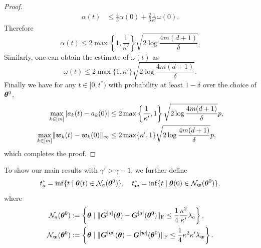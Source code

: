 \documentclass{article}
\begin{document}
\begin{proof}
\begin{align*}
        \alpha(t) & \leq\frac{4}{3}\alpha(0)+\frac{2}{3}\frac{1}{\kappa'}\omega(0).
    \end{align*}
    Therefore
    \begin{equation*}
        \alpha(t)\leq 2\max\left\{1,\frac{1}{\kappa'}\right\}\sqrt{2\log\frac{4m(d+1)}{\delta}}.
    \end{equation*}
    Similarly, one can obtain the estimate of $\omega(t)$ as
    \begin{equation*}
        \omega(t)\leq 2\max\{1,\kappa'\}\sqrt{2\log\frac{4m(d+1)}{\delta}}.
    \end{equation*}
    Finally we have for any $t\in[0, t^*)$ with probability at least $1-\delta$ over the choice of $\bm{\theta}^0$,
    \begin{equation*}
        \begin{aligned}
            \max\limits_{k\in[m]}|a_k(t) - a_k(0)|
             & \leq 2\max\left\{\frac{1}{\kappa'},1\right\}\sqrt{2\log\frac{4m(d+1)}{\delta}}p, \\
            \max\limits_{k\in[m]}\lVert\bm{w}_k(t) - \bm{w}_k(0)\rVert_{\infty}
             & \leq 2\max\{
            \kappa',1\}\sqrt{2\log\frac{4m(d+1)}{\delta}}p,
        \end{aligned}
    \end{equation*}
    which completes the proof.
\end{proof}

To show our main results with $\gamma'>\gamma-1$, we further define
\begin{equation}
    t^*_a=\inf\{t\mid \bm{\theta}(t)\in\mathcal{N}_a(\bm{\theta}^0)\}, \quad t^*_{\bm{w}}=\inf\{t\mid \bm{\theta}(0)\in\mathcal{N}_{\bm{w}}(\bm{\theta}^0)\},
\end{equation}
where
\begin{align}
    \mathcal{N}_a(\bm{\theta}^0)     & :=\left\{\bm{\theta}\mid\lVert\bm{G}^{[a]}(\bm{\theta})-\bm{G}^{[a]}(\bm{\theta}^0)\rVert_\mathrm{F}\leq\frac{1}{4}\frac{\kappa^2}{\kappa'}\lambda_a\right\}, \\
    \mathcal{N}_{\bm{w}}(\bm{\theta}^0) & :=\left\{\bm{\theta}\mid\lVert\bm{G}^{[\bm{w}]}(\bm{\theta})-\bm{G}^{[\bm{w}]}(\bm{\theta}^0)\rVert_\mathrm{F}\leq\frac{1}{4}\kappa^2\kappa'\lambda_{\bm{w}}\right\}.
\end{align}
\end{document}
